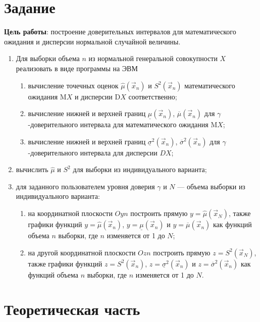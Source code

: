 \chapter{Задание}

\textbf{Цель работы}: построение доверительных интервалов для математического ожидания и дисперсии нормальной случайной величины.

\begin{enumerate}
	\item Для выборки объема $n$ из нормальной генеральной совокупности $X$ реализовать в виде программы на ЭВМ
		\begin{enumerate}
			\item вычисление точечных оценок $\hat\mu(\vec x_{n})$ и $S^2(\vec x_{n})$ математического ожидания M$X$ и дисперсии D$X$ соответственно;
			\item вычисление нижней и верхней границ $\underline{\mu}(\vec x_{n})$, $\overline{\mu}(\vec x_{n})$ для \newline$\gamma$-доверительного интервала для математического ожидания M$X$;
			\item вычисление нижней и верхней границ $\underline{\sigma}^2(\vec x_{n})$, $\overline{\sigma}^2(\vec x_{n})$ для \newline$\gamma$-доверительного интервала для дисперсии $DX$;
		\end{enumerate}
	\item вычислить $\hat\mu$ и $S^2$ для выборки из индивидуального варианта;
	\item для заданного пользователем уровня доверия $\gamma$ и $N$ --- объема выборки из индивидуального варианта:
		\begin{enumerate}
			\item на координатной плоскости $Oyn$ построить прямую $y = \hat\mu(\vec x_{N})$, также графики функций $y = \hat\mu(\vec x_{n})$, $y = \underline{\mu}(\vec x_{n})$ и $y = \overline{\mu}(\vec x_{n})$ как функций объема $n$ выборки, где $n$ изменяется от 1 до $N$;
			\item на другой координатной плоскости $Ozn$ построить прямую \newline$z = S^2(\vec x_{N})$, также графики функций $z = S^2(\vec x_{n})$, $z = \underline{\sigma}^2(\vec x_{n})$ и $z = \overline{\sigma}^2(\vec x_{n})$ как функций объема $n$ выборки, где $n$ изменяется от 1 до $N$.
		\end{enumerate}
\end{enumerate}

\chapter{Теоретическая часть}

